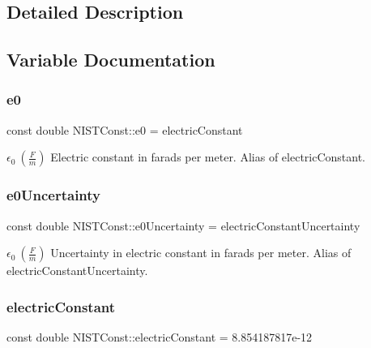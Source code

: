\subsection{Detailed Description}


\subsection{Variable Documentation}
\mbox{\label{group___electric_constant_ga6fa2aaf171b8dafe96bbd87c7aa95f59}} 
\subsubsection{\texorpdfstring{e0}{e0}}
{\footnotesize\ttfamily const double N\+I\+S\+T\+Const\+::e0 = electric\+Constant}

$\epsilon_0 \ (\frac{F}{m})$ Electric constant in farads per meter. Alias of electric\+Constant. \mbox{\label{group___electric_constant_ga35084e49b0f999bcafda4ae95038913c}} 
\subsubsection{\texorpdfstring{e0\+Uncertainty}{e0Uncertainty}}
{\footnotesize\ttfamily const double N\+I\+S\+T\+Const\+::e0\+Uncertainty = electric\+Constant\+Uncertainty}

$\epsilon_0 \ (\frac{F}{m})$ Uncertainty in electric constant in farads per meter. Alias of electric\+Constant\+Uncertainty. \mbox{\label{group___electric_constant_gae5a425228125285727dd53333725ef76}} 
\subsubsection{\texorpdfstring{electric\+Constant}{electricConstant}}
{\footnotesize\ttfamily const double N\+I\+S\+T\+Const\+::electric\+Constant = 8.\+854187817e-\/12}

